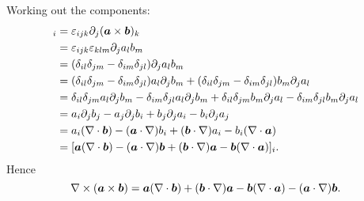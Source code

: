 \documentclass[a4paper]{article}
\begin{document}
\begin{example}
        Working out the components:
        \begin{align*}
            [\curl(\vv{a}\times\vv{b})]_i &= \varepsilon_{ijk}\partial_j(\vv{a}\times\vv{b})_k\\
            &= \varepsilon_{ijk}\varepsilon_{klm}\partial_ja_lb_m\\
            &= (\delta_{il}\delta_{jm} - \delta_{im}\delta_{jl})\partial_ja_lb_m\\
            &= (\delta_{il}\delta_{jm} - \delta_{im}\delta_{jl})a_l\partial_jb_m + (\delta_{il}\delta_{jm} - \delta_{im}\delta_{jl})b_m\partial_ja_l\\
            &= \delta_{il}\delta_{jm}a_l\partial_jb_m - \delta_{im}\delta_{jl}a_l\partial_jb_m + \delta_{il}\delta_{jm}b_m\partial_ja_l - \delta_{im}\delta_{jl}b_m\partial_ja_l\\
            &= a_i\partial_jb_j - a_j\partial_jb_i + b_j\partial_ja_i - b_i\partial_ja_j\\
            &= a_i(\div\vv{b}) - (\vv{a}\cdot\grad)b_i + (\vv{b}\cdot\grad)a_i - b_i(\div\vv{a})\\
            &= [\vv{a}(\div\vv{b}) - (\vv{a}\cdot\grad)\vv{b} + (\vv{b}\cdot\grad)\vv{a} - \vv{b}(\div\vv{a})]_i.
        \end{align*}
        Hence
        \[\nabla\times(\bm{a}\times\bm{b}) = \bm{a}(\nabla\cdot\bm{b}) + (\bm{b}\cdot\nabla)\bm{a} - \bm{b}(\nabla\cdot\bm{a}) - (\bm{a}\cdot\nabla)\bm{b}.\]
    \end{example}
    
\end{document}
